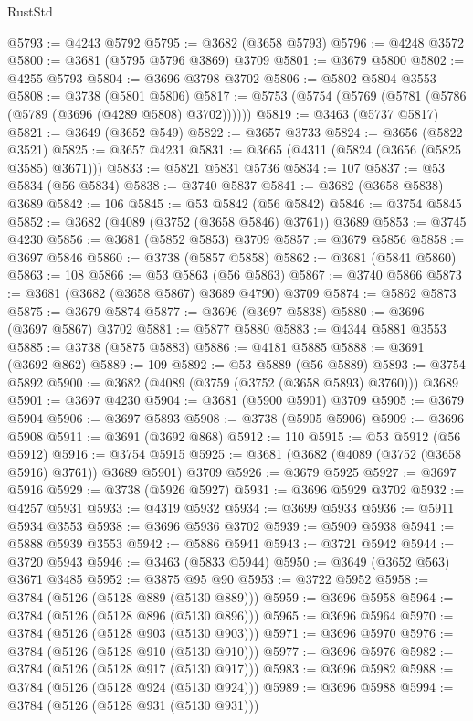 \begin{lexlean}{RustStd}
\begin{coremodule}
@5793 := @4243 @5792
@5795 := @3682 (@3658 @5793)
@5796 := @4248 @3572
@5800 := @3681 (@5795 @5796 @3869) @3709
@5801 := @3679 @5800
@5802 := @4255 @5793
@5804 := @3696 @3798 @3702
@5806 := @5802 @5804 @3553
@5808 := @3738 (@5801 @5806)
@5817 := @5753 (@5754 (@5769 (@5781 (@5786 (@5789 (@3696 (@4289 @5808) @3702))))))
@5819 := @3463 (@5737 @5817)
@5821 := @3649 (@3652 @549)
@5822 := @3657 @3733
@5824 := @3656 (@5822 @3521)
@5825 := @3657 @4231
@5831 := @3665 (@4311 (@5824 (@3656 (@5825 @3585) @3671)))
@5833 := @5821 @5831 @5736
@5834 := 107
@5837 := @53 @5834 (@56 @5834)
@5838 := @3740 @5837
@5841 := @3682 (@3658 @5838) @3689
@5842 := 106
@5845 := @53 @5842 (@56 @5842)
@5846 := @3754 @5845
@5852 := @3682 (@4089 (@3752 (@3658 @5846) @3761)) @3689
@5853 := @3745 @4230
@5856 := @3681 (@5852 @5853) @3709
@5857 := @3679 @5856
@5858 := @3697 @5846
@5860 := @3738 (@5857 @5858)
@5862 := @3681 (@5841 @5860)
@5863 := 108
@5866 := @53 @5863 (@56 @5863)
@5867 := @3740 @5866
@5873 := @3681 (@3682 (@3658 @5867) @3689 @4790) @3709
@5874 := @5862 @5873
@5875 := @3679 @5874
@5877 := @3696 (@3697 @5838)
@5880 := @3696 (@3697 @5867) @3702
@5881 := @5877 @5880
@5883 := @4344 @5881 @3553
@5885 := @3738 (@5875 @5883)
@5886 := @4181 @5885
@5888 := @3691 (@3692 @862)
@5889 := 109
@5892 := @53 @5889 (@56 @5889)
@5893 := @3754 @5892
@5900 := @3682 (@4089 (@3759 (@3752 (@3658 @5893) @3760))) @3689
@5901 := @3697 @4230
@5904 := @3681 (@5900 @5901) @3709
@5905 := @3679 @5904
@5906 := @3697 @5893
@5908 := @3738 (@5905 @5906)
@5909 := @3696 @5908
@5911 := @3691 (@3692 @868)
@5912 := 110
@5915 := @53 @5912 (@56 @5912)
@5916 := @3754 @5915
@5925 := @3681 (@3682 (@4089 (@3752 (@3658 @5916) @3761)) @3689 @5901) @3709
@5926 := @3679 @5925
@5927 := @3697 @5916
@5929 := @3738 (@5926 @5927)
@5931 := @3696 @5929 @3702
@5932 := @4257 @5931
@5933 := @4319 @5932
@5934 := @3699 @5933
@5936 := @5911 @5934 @3553
@5938 := @3696 @5936 @3702
@5939 := @5909 @5938
@5941 := @5888 @5939 @3553
@5942 := @5886 @5941
@5943 := @3721 @5942
@5944 := @3720 @5943
@5946 := @3463 (@5833 @5944)
@5950 := @3649 (@3652 @563) @3671 @3485
@5952 := @3875 @95 @90
@5953 := @3722 @5952
@5958 := @3784 (@5126 (@5128 @889 (@5130 @889)))
@5959 := @3696 @5958
@5964 := @3784 (@5126 (@5128 @896 (@5130 @896)))
@5965 := @3696 @5964
@5970 := @3784 (@5126 (@5128 @903 (@5130 @903)))
@5971 := @3696 @5970
@5976 := @3784 (@5126 (@5128 @910 (@5130 @910)))
@5977 := @3696 @5976
@5982 := @3784 (@5126 (@5128 @917 (@5130 @917)))
@5983 := @3696 @5982
@5988 := @3784 (@5126 (@5128 @924 (@5130 @924)))
@5989 := @3696 @5988
@5994 := @3784 (@5126 (@5128 @931 (@5130 @931)))

\end{coremodule}
\end{lexlean}
